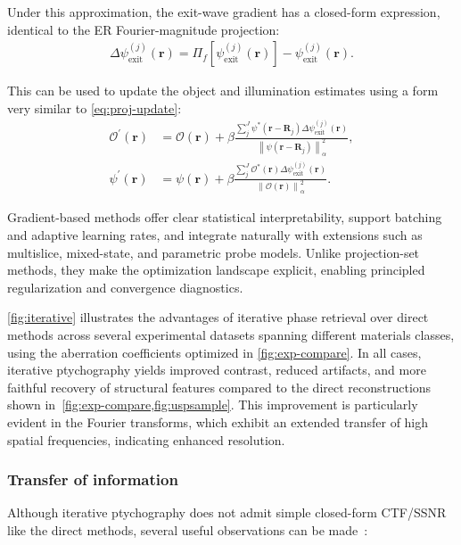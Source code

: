 \documentclass[pdflatex,sn-aps,iicol]{sn-jnl}%
\begin{document}
Under this approximation, the exit-wave gradient has a closed-form expression, identical to the ER Fourier-magnitude projection:
\begin{align}
\Delta \psi_{\text{exit}}^{(j)}(\boldsymbol{r})
=
\Pi_f\!\left[
\psi_{\text{exit}}^{(j)}(\boldsymbol{r})
\right]
-
\psi_{\text{exit}}^{(j)}(\boldsymbol{r}).
\label{eq:gd}
\end{align}

This can be used to update the object and illumination estimates using a form very similar to \cref{eq:proj-update}:
\begin{align}
\mathcal{O}^{' }(\boldsymbol{r})
&=
\mathcal{O}(\boldsymbol{r})
+
\beta
\frac{
\sum_j^J
\psi^{*}(\boldsymbol{r}-\boldsymbol{R}_j)
\Delta \psi_{\text{exit}}^{(j)}(\boldsymbol{r})
}{
\left\lVert
\psi(\boldsymbol{r}-\boldsymbol{R}_j)
\right\rVert^2_{\alpha}
},\\
\psi^{' }(\boldsymbol{r})
&=
\psi(\boldsymbol{r})
+
\beta
\frac{
\sum_j^J
\mathcal{O}^{*}(\boldsymbol{r})
\Delta \psi_{\text{exit}}^{(j)}(\boldsymbol{r})
}{
\left\lVert
\mathcal{O}(\boldsymbol{r})
\right\rVert^2_{\alpha}
}.
\label{eq:sgd-update}
\end{align}

Gradient-based methods offer clear statistical interpretability, support batching and adaptive learning rates, and integrate naturally with extensions such as multislice, mixed-state, and parametric probe models.
Unlike projection-set methods, they make the optimization landscape explicit, enabling principled regularization and convergence diagnostics.

\cref{fig:iterative} illustrates the advantages of iterative phase retrieval over direct methods across several experimental datasets spanning different materials classes, using the aberration coefficients optimized in \cref{fig:exp-compare}.
In all cases, iterative ptychography yields improved contrast, reduced artifacts, and more faithful recovery of structural features compared to the direct reconstructions shown in~\cref{fig:exp-compare,fig:uspsample}.
This improvement is particularly evident in the Fourier transforms, which exhibit an extended transfer of high spatial frequencies, indicating enhanced resolution.

\subsubsection*{Transfer of information}

Although iterative ptychography does not admit simple closed-form CTF/SSNR like the direct methods, several useful observations can be made~\cite{Varnavides_2025_ssnr}:
\end{document}
